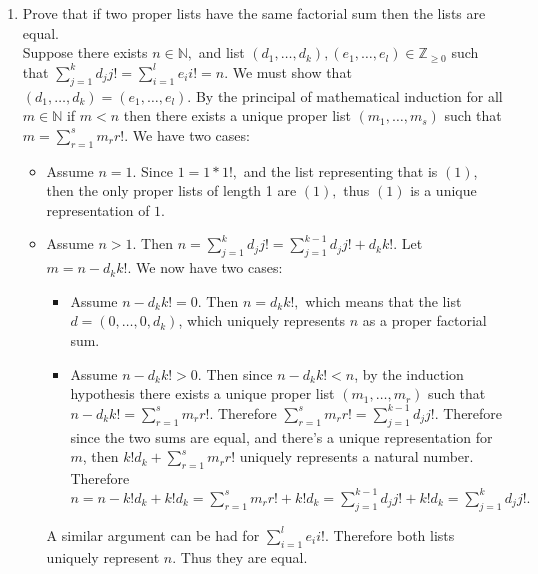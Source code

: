 \documentclass[12pt, letterpaper]{article}
\newcommand{\Z}{\mathbb{Z}}
\newcommand{\N}{\mathbb{N}}
\begin{document}
\begin{enumerate}
\begin{itemize}
\begin{itemize}
\end{itemize}		 
	\end{itemize}
\item Prove that if two proper lists have the same factorial sum then the lists are equal.\\
	Suppose there exists $n\in \N,$ and list $(d_1,\ldots,d_k), (e_1,\ldots,e_l) \in \Z_{\geq 0}$ such that $\sum_{j=1}^k d_j j! =  \sum_{i=1}^l e_i i! = n.$ We must show that $(d_1,\ldots,d_k)=(e_1,\ldots,e_l).$  By the principal of mathematical induction for all $m \in \N$ if $m < n$ then there exists a unique proper list $(m_1,\ldots,m_s)$ such that $m = \sum_{r=1}^s m_r r!.$   %
	We have two cases:
	\begin{itemize}
		\item Assume $n=1$.  Since $1=1*1!,$ and the list representing that is $(1)$, then the only proper lists of length 1 are $(1),$ thus $(1)$ is a unique representation of $1$.
		\item Assume $n > 1.$  Then $n = \sum_{j=1}^k d_j j! = \sum_{j=1}^{k-1} d_j j! + d_k k!.$  Let $m = n - d_k k!.$  We now have two cases:
		\begin{itemize}
			\item Assume $n - d_k k! = 0$.  Then $n = d_k k!,$ which means that the list $d=(0,\ldots,0,d_k)$, which uniquely represents $n$ as a proper factorial sum.
			\item Assume $n - d_k k! > 0.$  Then since $n - d_k k! < n$, by the induction hypothesis there exists a unique proper list $(m_1,\ldots,m_r)$ such that $n - d_k k! = \sum_{r=1}^s m_r r!.$ Therefore $\sum_{r=1}^s m_r r! = \sum_{j=1}^{k-1} d_j j!$.  Therefore since the two sums are equal, and there's a unique representation for $m$, then $k! d_k + \sum_{r=1}^s m_r r!$ uniquely represents a natural number. Therefore $n = n -k! d_k  + k! d_k = \sum_{r=1}^s m_r r! + k! d_k = \sum_{j=1}^{k-1} d_j j! + k! d_k = \sum_{j=1}^{k} d_j j!.$   
\end{itemize}		   
A similar argument can be had for $\sum_{i=1}^l e_i i!$.  Therefore both lists uniquely represent $n$.  Thus they are equal.  
		
		
		
	\end{itemize}
\end{enumerate} 
\end{document}
